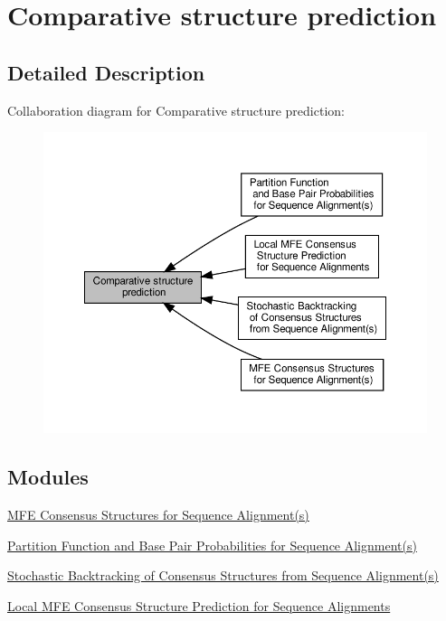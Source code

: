 \hypertarget{group__consensus__fold}{}\section{Comparative structure prediction}
\label{group__consensus__fold}


\subsection{Detailed Description}
Collaboration diagram for Comparative structure prediction\+:
\nopagebreak
\begin{figure}[H]
\begin{center}
\leavevmode
\includegraphics[width=350pt]{group__consensus__fold}
\end{center}
\end{figure}
\subsection*{Modules}
\begin{DoxyCompactItemize}
\item 
\hyperlink{group__consensus__mfe__fold}{M\+F\+E Consensus Structures for Sequence Alignment(s)}
\item 
\hyperlink{group__consensus__pf__fold}{Partition Function and Base Pair Probabilities for Sequence Alignment(s)}
\item 
\hyperlink{group__consensus__stochbt}{Stochastic Backtracking of Consensus Structures from Sequence Alignment(s)}
\item 
\hyperlink{group__local__consensus__fold}{Local M\+F\+E Consensus Structure Prediction for Sequence Alignments}
\end{DoxyCompactItemize}
